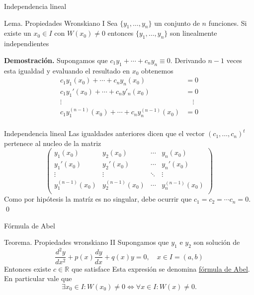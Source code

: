 \documentclass[handout,hyperref={colorlinks=true}]{beamer}
\newcommand{\rr}{\mathbb{R}}
\newcommand{\nl}{\onslide<+-> }
\begin{document}
\begin{frame}{Independencia lineal}
\nl\begin{block}{Lema. Propiedades Wronskiano I}
Sea $\{y_1,\ldots,y_n\}$ un conjunto de $n$ funciones. Si existe un $x_0\in I$ con $W(x_0)\neq 0$ entonces   $\{y_1,\ldots,y_n\}$ son
linealmente independientes
\end{block}

\nl\textbf{Demostración.} Supongamos que $c_1y_1+\cdots+c_ny_n\equiv 0$. Derivando $n-1$ veces esta igualdad y evaluando el resultado en $x_0$ obtenemos
\[
 \begin{split}
    c_1y_1(x_0)+\cdots+c_ny_n(x_0)&=0\\
    c_1y_1'(x_0)+\cdots+c_ny'_n(x_0)&=0\\
    \vdots \quad& \quad\vdots\\
    c_1y_1^{(n-1)}(x_0)+\cdots+c_ny^{(n-1)}_n(x_0)&=0\\
 \end{split}
\]


\end{frame}

\begin{frame}{Independencia lineal}
 Las igualdades anteriores dicen que el vector $(c_1,\ldots,c_n)^t$ pertenece al nucleo de la matriz 
\[
\begin{pmatrix}
                                  y_1(x_0) & y_2(x_0) & \cdots &y_n(x_0)\\
                                  y_1'(x_0) & y_2'(x_0) & \cdots &y_n'(x_0)\\
                                  \vdots & \vdots &\ddots& \vdots\\
                                  y_1^{(n-1)}(x_0) & y_2^{(n-1)}(x_0) & \cdots &y_n^{(n-1)}(x_0)\\
                               \end{pmatrix}
\]
Como por hipótesis la matríz es no singular, debe ocurrir que $c_1=c_2=\cdots c_n=0$. \qed

\end{frame}
\begin{frame}{Fórmula de Abel}
\begin{block}{Teorema. Propiedades wronskiano II}
Supongamos que  $y_1$ e $y_2$  son solución de 
\begin{equation}\label{eq2orden}\frac{d^2y}{dx^2}+p(x)\frac{dy}{dx}+q(x)y=0,\quad x\in I=(a,b)\end{equation}
 Entonces existe $c\in\rr$ que satisface
Esta expresión  se denomina \href{http://en.wikipedia.org/wiki/Abel's_identity}{fórmula de Abel}. En particular vale que
\[\exists x_0\in I: W(x_0)\neq 0 \Longleftrightarrow \forall x\in I: W(x)\neq 0 .\]
\end{block}
\end{frame}
\end{document}
